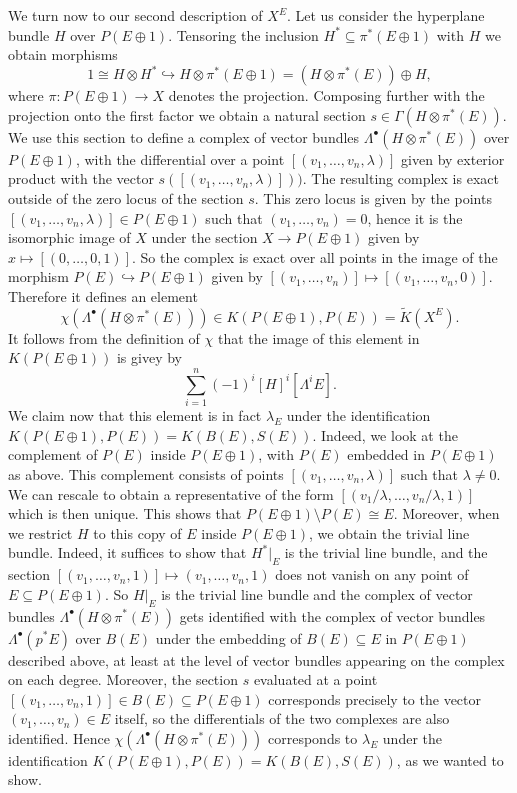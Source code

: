 \documentclass[12pt,a4paper]{amsart}
\theoremstyle{plain}
\theoremstyle{definition}
\theoremstyle{remark}
\begin{document}
We turn now to our second description of $X^{E}$.
Let us consider the hyperplane bundle $H$ over $P(E \oplus 1)$.
Tensoring the inclusion $H^{*} \subseteq \pi^{*}(E \oplus 1)$ with $H$ we obtain morphisms
\[ 1 \cong H \otimes H^{*} \hookrightarrow H \otimes \pi^{*}(E \oplus 1) = (H \otimes \pi^{*}(E)) \oplus H, \]
where $\pi \colon P(E \oplus 1) \to X$ denotes the projection.
Composing further with the projection onto the first factor we obtain a natural section $s \in \Gamma(H \otimes \pi^{*}(E))$.
We use this section to define a complex of vector bundles $\Lambda^{\bullet}(H \otimes \pi^{*}(E))$ over $P(E \oplus 1)$, with the differential over a point $[(v_{1}, \ldots, v_{n}, \lambda)]$ given by exterior product with the vector $s([(v_{1}, \ldots, v_{n}, \lambda)]))$.
The resulting complex is exact outside of the zero locus of the section $s$.
This zero locus is given by the points $[(v_{1}, \ldots, v_{n}, \lambda)] \in P(E \oplus 1)$ such that $(v_{1}, \ldots, v_{n}) = 0$, hence it is the isomorphic image of $X$ under the section $X \to P(E \oplus 1)$ given by $x \mapsto [(0, \ldots, 0, 1)]$.
So the complex is exact over all points in the image of the morphism $P(E) \hookrightarrow P(E \oplus 1)$ given by $[(v_{1}, \ldots, v_{n})] \mapsto [(v_{1}, \ldots, v_{n}, 0)]$.
Therefore it defines an element
\[ \chi(\Lambda^{\bullet}(H \otimes \pi^{*}(E))) \in K(P(E \oplus 1), P(E)) = \tilde{K}(X^{E}). \]
It follows from the definition of $\chi$ \cite[Definition 2.6.2]{ati67} that the image of this element in $K(P(E \oplus 1))$ is givey by
\[ \sum_{i = 1}^{n} (-1)^{i} [H]^{i}[\Lambda^{i}E]. \]
We claim now that this element is in fact $\lambda_{E}$ under the identification $K(P(E \oplus 1), P(E)) = K(B(E),S(E))$.
Indeed, we look at the complement of $P(E)$ inside $P(E \oplus 1)$, with $P(E)$ embedded in $P(E \oplus 1)$ as above.
This complement consists of points $[(v_{1}, \ldots, v_{n}, \lambda)]$ such that $\lambda \neq 0$.
We can rescale to obtain a representative of the form $[(v_{1}/\lambda, \ldots, v_{n}/\lambda,1)]$ which is then unique.
This shows that $P(E \oplus 1) \setminus P(E) \cong E$.
Moreover, when we restrict $H$ to this copy of $E$ inside $P(E \oplus 1)$, we obtain the trivial line bundle.
Indeed, it suffices to show that $H^{*}|_{E}$ is the trivial line bundle, and the section $[(v_{1}, \ldots, v_{n}, 1)] \mapsto (v_{1}, \ldots, v_{n},1)$ does not vanish on any point of $E \subseteq P(E \oplus 1)$.
So $H|_{E}$ is the trivial line bundle and the complex of vector bundles $\Lambda^{\bullet}(H \otimes \pi^{*}(E))$ gets identified with the complex of vector bundles $\Lambda^{\bullet}(p^{*}E)$ over $B(E)$ under the embedding of $B(E) \subseteq E$ in $P(E \oplus 1)$ described above, at least at the level of vector bundles appearing on the complex on each degree.
Moreover, the section $s$ evaluated at a point $[(v_{1}, \ldots, v_{n},1)] \in B(E) \subseteq P(E \oplus 1)$ corresponds precisely to the vector $(v_{1}, \ldots, v_{n}) \in E$ itself, so the differentials of the two complexes are also identified.
Hence $\chi(\Lambda^{\bullet}(H \otimes \pi^{*}(E)))$ corresponds to $\lambda_{E}$ under the identification $K(P(E \oplus 1), P(E)) = K(B(E),S(E))$, as we wanted to show.
\end{document}
